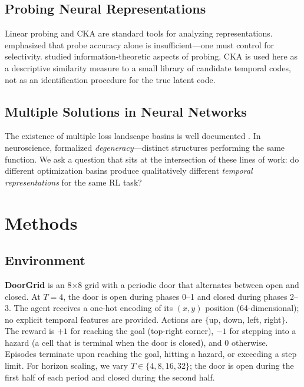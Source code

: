 \documentclass{article}
\begin{document}
\subsection{Probing Neural Representations}

Linear probing \citep{alain2017probe} and CKA \citep{kornblith2019cka} are standard tools for analyzing representations.
\citet{hewitt2019designing} emphasized that probe accuracy alone is insufficient---one must control for selectivity.
\citet{voita2020information} studied information-theoretic aspects of probing.
CKA is used here as a descriptive similarity measure to a small library of candidate temporal codes, not as an identification procedure for the true latent code.

\subsection{Multiple Solutions in Neural Networks}

The existence of multiple loss landscape basins is well documented \citep{garipov2018loss,li2018visualizing,draxler2018essentially}.
In neuroscience, \citet{edelman2001degeneracy} formalized \emph{degeneracy}---distinct structures performing the same function.
We ask a question that sits at the intersection of these lines of work: do different optimization basins produce qualitatively different \emph{temporal representations} for the same RL task?

\section{Methods}

\subsection{Environment}

\textbf{DoorGrid} is an 8$\times$8 grid with a periodic door that alternates between open and closed.
At $T = 4$, the door is open during phases 0--1 and closed during phases 2--3.
The agent receives a one-hot encoding of its $(x, y)$ position (64-dimensional); no explicit temporal features are provided.
Actions are $\{$up, down, left, right$\}$.
The reward is $+1$ for reaching the goal (top-right corner), $-1$ for stepping into a hazard (a cell that is terminal when the door is closed), and $0$ otherwise.
Episodes terminate upon reaching the goal, hitting a hazard, or exceeding a step limit.
For horizon scaling, we vary $T \in \{4, 8, 16, 32\}$; the door is open during the first half of each period and closed during the second half.
\end{document}
